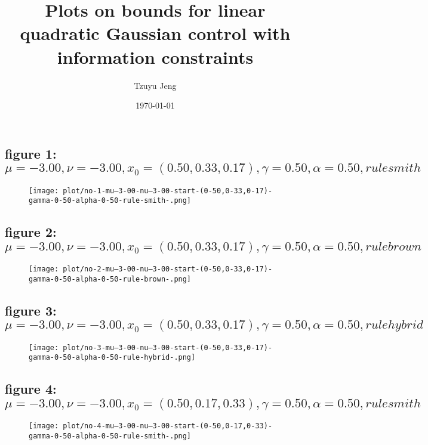 \documentclass[a4paper]{article}
\title{Plots on bounds for linear quadratic Gaussian
   control with information constraints}
\author{Tzuyu Jeng}
\date{\today}
\begin{document}
      \maketitle
      \begin{multicols*}{2}
   

   \subsection{figure 1: \(\mu = -3.00, \nu = -3.00, x_0 = (0.50,0.33,0.17), \gamma = 0.50, \alpha = 0.50, rule smith\)}
   

   \begin{figure}[H]
   \centering
   \texttt{[image: plot/no-1-mu--3-00-nu--3-00-start-(0-50,0-33,0-17)-gamma-0-50-alpha-0-50-rule-smith-.png]}
   \end{figure}
   

   \subsection{figure 2: \(\mu = -3.00, \nu = -3.00, x_0 = (0.50,0.33,0.17), \gamma = 0.50, \alpha = 0.50, rule brown\)}
   

   \begin{figure}[H]
   \centering
   \texttt{[image: plot/no-2-mu--3-00-nu--3-00-start-(0-50,0-33,0-17)-gamma-0-50-alpha-0-50-rule-brown-.png]}
   \end{figure}
   

   \subsection{figure 3: \(\mu = -3.00, \nu = -3.00, x_0 = (0.50,0.33,0.17), \gamma = 0.50, \alpha = 0.50, rule hybrid\)}
   

   \begin{figure}[H]
   \centering
   \texttt{[image: plot/no-3-mu--3-00-nu--3-00-start-(0-50,0-33,0-17)-gamma-0-50-alpha-0-50-rule-hybrid-.png]}
   \end{figure}
   

   \subsection{figure 4: \(\mu = -3.00, \nu = -3.00, x_0 = (0.50,0.17,0.33), \gamma = 0.50, \alpha = 0.50, rule smith\)}
   

   \begin{figure}[H]
   \centering
   \texttt{[image: plot/no-4-mu--3-00-nu--3-00-start-(0-50,0-17,0-33)-gamma-0-50-alpha-0-50-rule-smith-.png]}
   \end{figure}
   


\end{multicols*}
\end{document}
